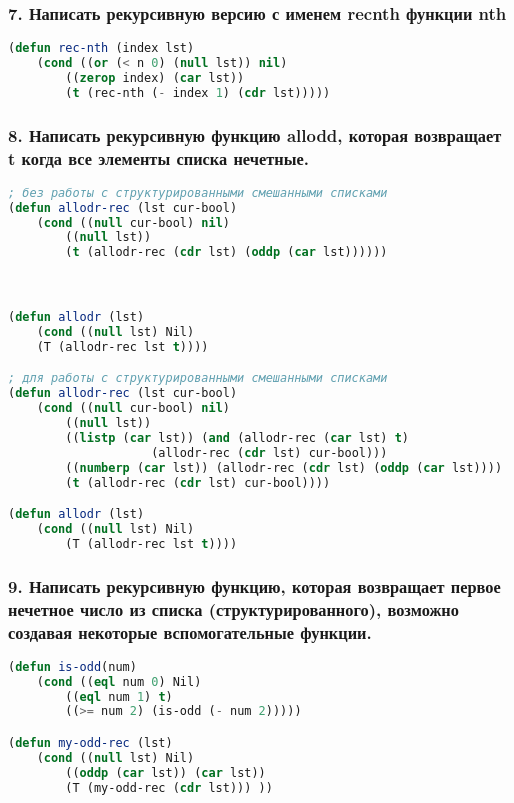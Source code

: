 \subsubsection*{7. Написать рекурсивную версию с именем recnth функции nth}
\begin{lstlisting}[language=Lisp]
(defun rec-nth (index lst)
	(cond ((or (< n 0) (null lst)) nil)
		((zerop index) (car lst))
		(t (rec-nth (- index 1) (cdr lst)))))
\end{lstlisting}


\subsubsection*{8. Написать рекурсивную функцию allodd, которая возвращает t когда все элементы списка	нечетные.}
\begin{lstlisting}[language=Lisp]
; без работы с структурированными смешанными списками
(defun allodr-rec (lst cur-bool)
	(cond ((null cur-bool) nil)
		((null lst))
		(t (allodr-rec (cdr lst) (oddp (car lst))))))



(defun allodr (lst)
	(cond ((null lst) Nil)
	(T (allodr-rec lst t))))

; для работы с структурированными смешанными списками
(defun allodr-rec (lst cur-bool)
	(cond ((null cur-bool) nil)
		((null lst))
		((listp (car lst)) (and (allodr-rec (car lst) t) 
					(allodr-rec (cdr lst) cur-bool)))
		((numberp (car lst)) (allodr-rec (cdr lst) (oddp (car lst))))
		(t (allodr-rec (cdr lst) cur-bool))))

(defun allodr (lst)
	(cond ((null lst) Nil)
		(T (allodr-rec lst t))))
\end{lstlisting}


\subsubsection*{9. Написать рекурсивную функцию, которая возвращает первое нечетное число из списка (структурированного), возможно создавая некоторые вспомогательные функции.}
\begin{lstlisting}[language=Lisp]
(defun is-odd(num)
	(cond ((eql num 0) Nil)
		((eql num 1) t)
		((>= num 2) (is-odd (- num 2)))))

(defun my-odd-rec (lst)
	(cond ((null lst) Nil)
		((oddp (car lst)) (car lst))
		(T (my-odd-rec (cdr lst))) ))
\end{lstlisting}


